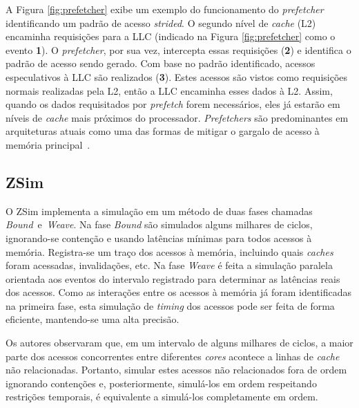 \documentclass[12pt]{article}
\begin{document}
\vspace{-2mm}
A Figura \ref{fig:prefetcher} exibe um exemplo do funcionamento do \textit{prefetcher} identificando um padrão de acesso \textit{strided}.
O segundo nível de \textit{cache} (L2) encaminha requisições para a LLC (indicado na Figura \ref{fig:prefetcher} como o evento \textbf{1}).
O \textit{prefetcher}, por sua vez, intercepta essas requisições (\textbf{2}) e identifica o padrão de acesso sendo gerado.
Com base no padrão identificado, acessos especulativos à LLC são realizados (\textbf{3}).
Estes acessos são vistos como requisições normais realizadas pela L2, então a LLC encaminha esses dados à L2.
Assim, quando os dados requisitados por \textit{prefetch} forem necessários, eles já estarão em níveis de \textit{cache} mais próximos do processador.
\textit{Prefetchers} são predominantes em arquiteturas atuais como uma das formas de mitigar o gargalo de acesso à memória principal~\mbox{\cite{bakhshalipour2019bingo}}.


\vspace{-2mm}
\subsection{ZSim}

O ZSim implementa a simulação em um método de duas fases chamadas \mbox{\textit{Bound} e \emph{Weave}}. 
Na fase \textit{Bound} são simulados alguns milhares de ciclos, ignorando-se contenção e usando latências mínimas para todos acessos à memória.
Registra-se um traço dos acessos à memória, incluindo quais \textit{caches} foram acessadas, invalidações, etc.
Na fase \textit{Weave} é feita a simulação paralela orientada aos eventos do intervalo registrado para determinar as latências reais dos acessos.
Como as interações entre os acessos à memória já foram identificadas na primeira fase, esta simulação de \emph{timing} dos acessos pode ser feita de forma eficiente, mantendo-se uma alta precisão.

\vspace{-2mm}
Os autores observaram que, em um intervalo de alguns milhares de ciclos, a maior parte dos acessos concorrentes entre diferentes \textit{cores} acontece a linhas de \textit{cache} não relacionadas. 
Portanto, simular estes acessos não relacionados fora de ordem ignorando contenções e, posteriormente, simulá-los em ordem respeitando restrições temporais, é equivalente a simulá-los completamente em ordem.
\end{document}
